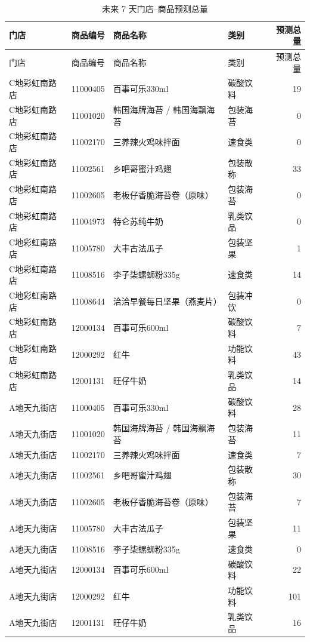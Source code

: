 \begingroup
\small
\setlength{\tabcolsep}{3pt}
\begin{longtable}{p{2.4cm}p{1.9cm}p{4.4cm}p{1.8cm}r}
\caption{未来 7 天门店--商品预测总量}\\
\toprule
门店 & 商品编号 & 商品名称 & 类别 & 预测总量 \\
\midrule
\endfirsthead
\toprule
门店 & 商品编号 & 商品名称 & 类别 & 预测总量 \\
\midrule
\endhead
C地彩虹南路店 & 11000405 & 百事可乐330ml & 碳酸饮料 & 19 \\
C地彩虹南路店 & 11001020 & 韩国海牌海苔 / 韩国海飘海苔 & 包装海苔 & 0 \\
C地彩虹南路店 & 11002170 & 三养辣火鸡味拌面 & 速食类 & 0 \\
C地彩虹南路店 & 11002561 & 乡吧哥蜜汁鸡翅 & 包装散称 & 33 \\
C地彩虹南路店 & 11002605 & 老板仔香脆海苔卷（原味） & 包装海苔 & 0 \\
C地彩虹南路店 & 11004973 & 特仑苏纯牛奶 & 乳类饮品 & 0 \\
C地彩虹南路店 & 11005780 & 大丰古法瓜子 & 包装坚果 & 1 \\
C地彩虹南路店 & 11008516 & 李子柒螺蛳粉335g & 速食类 & 14 \\
C地彩虹南路店 & 11008644 & 洽洽早餐每日坚果（燕麦片） & 包装冲饮 & 0 \\
C地彩虹南路店 & 12000134 & 百事可乐600ml & 碳酸饮料 & 7 \\
C地彩虹南路店 & 12000292 & 红牛 & 功能饮料 & 43 \\
C地彩虹南路店 & 12001131 & 旺仔牛奶 & 乳类饮品 & 14 \\
A地天九街店 & 11000405 & 百事可乐330ml & 碳酸饮料 & 28 \\
A地天九街店 & 11001020 & 韩国海牌海苔 / 韩国海飘海苔 & 包装海苔 & 11 \\
A地天九街店 & 11002170 & 三养辣火鸡味拌面 & 速食类 & 7 \\
A地天九街店 & 11002561 & 乡吧哥蜜汁鸡翅 & 包装散称 & 30 \\
A地天九街店 & 11002605 & 老板仔香脆海苔卷（原味） & 包装海苔 & 7 \\
A地天九街店 & 11005780 & 大丰古法瓜子 & 包装坚果 & 11 \\
A地天九街店 & 11008516 & 李子柒螺蛳粉335g & 速食类 & 0 \\
A地天九街店 & 12000134 & 百事可乐600ml & 碳酸饮料 & 22 \\
A地天九街店 & 12000292 & 红牛 & 功能饮料 & 101 \\
A地天九街店 & 12001131 & 旺仔牛奶 & 乳类饮品 & 16 \\

\end{longtable}
